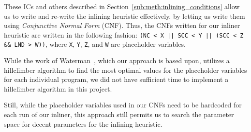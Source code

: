 These ICs and others described in Section~\ref{sub:meth:inlining_conditions}
allow us to write and re-write the inlining heuristic effectively, by letting us
write them using \textit{Conjunctive Normal Form} (CNF). Thus, the CNFs written
for our inliner heuristic are written in the following fashion:
\lstinline"(NC < X || SCC < Y || (SCC < Z && LND > W))", where \lstinline!X!,
\lstinline!Y!, \lstinline!Z!, and \lstinline!W! are placeholder variables.

While the work of Waterman~\cite{AdaptvCompilAndInlingWaterman}, which our
approach is based upon, utilizes a hillclimber algorithm to find the most
optimal values for the placeholder variables for each individual program, we did
not have sufficient time to implement a hillclimber algorithm in this project.

Still, while the placeholder variables used in our CNFs need to be hardcoded for
each run of our inliner, this approach still permits us to search the parameter
space for decent parameters for the inlining heuristic.

